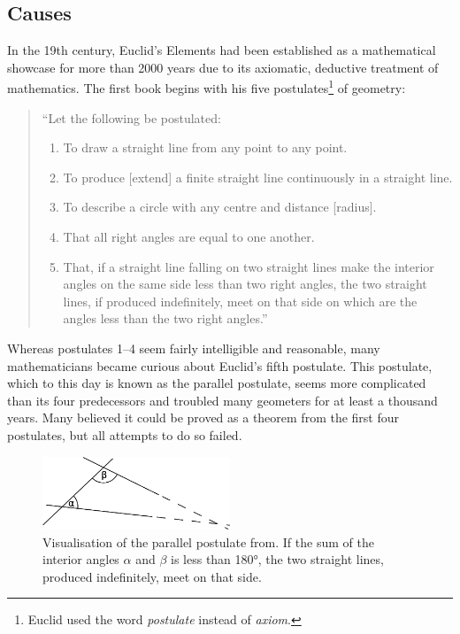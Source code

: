 \documentclass[hidelinks]{article}
\begin{document}
\subsection{Causes}\label{ssec_causes}
In the 19th century, Euclid's Elements had been established as a mathematical showcase for more than 2000 years due to its axiomatic, deductive treatment of mathematics. The first book begins with his five postulates\footnote{Euclid used the word \textit{postulate} instead of \textit{axiom}.} of geometry:
\begin{quote}
``Let the following be postulated:
\begin{enumerate}
\item To draw a straight line from any point to any point.
\item To produce [extend] a finite straight line continuously in a straight line.
\item To describe a circle with any centre and distance [radius].
\item That all right angles are equal to one another.
\item That, if a straight line falling on two straight lines make the interior angles on the same side less than two right angles, the two straight lines, if produced indefinitely, meet on that side on which are the angles less than the two right angles.''
\end{enumerate}
\end{quote}
Whereas postulates 1--4 seem fairly intelligible and reasonable, many mathematicians became curious about Euclid's fifth postulate. This postulate, which to this day is known as the parallel postulate, seems more complicated than its four predecessors and troubled many geometers for at least a thousand years. Many believed it could be proved as a theorem from the first four postulates, but all attempts to do so failed. 

\begin{figure}[h]
	\centering
	\includegraphics[width=0.5\textwidth]{img/parallel_postulate.png}
	\caption{Visualisation of the parallel postulate from\cite[Wikimedia]{wiki_parallel_postulate}. If the sum of the interior angles $\alpha$ and $\beta$ is less than 180°, the two straight lines, produced indefinitely, meet on that side.}
\end{figure}
\end{document}
